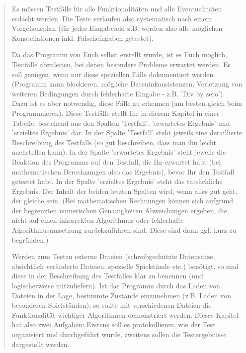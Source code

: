 \documentclass[12pt, letterpaper, twoside]{article}
\begin{document}
            \begin{verse}
                Es müssen Testfälle für alle Funktionalitäten und alle Eventualitäten erdacht werden. Die Tests verlaufen also systematisch nach einem Vorgehensplan (für jedes Eingabefeld z.B. werden also alle möglichen Konstellationen inkl. Falscheingaben getestet).

                Da das Programm von Euch selbst erstellt wurde, ist es Euch möglich, Testfälle abzuleiten, bei denen besondere Probleme erwartet werden. Es soll genügen, wenn nur diese speziellen Fälle dokumentiert werden (Programm kann blockieren, mögliche Dateninkonsistenzen, Verletzung von weiteren Bedingungen durch fehlerhafte Eingabe - z.B. 'Div by zero'). Dazu ist es aber notwendig, diese Fälle zu erkennen (am besten gleich beim Programmieren). 
                Diese Testfälle stellt Ihr in diesem Kapitel in einer Tabelle, bestehend aus den Spalten 'Testfall', 'erwartetes Ergebnis' und 'erzieltes Ergebnis' dar. In der Spalte 'Testfall' steht jeweils eine detaillierte Beschreibung des Testfalls (so gut beschreiben, dass man ihn leicht nachstellen kann). In der Spalte 'erwartetes Ergebnis' steht jeweils die Reaktion des Programms auf den Testfall, die Ihr erwartet habt (bei mathematischen Berechnungen also das Ergebnis), bevor Ihr den Testfall getestet habt. In der Spalte 'erzieltes Ergebnis' steht das tatsächliche Ergebnis. Der Inhalt der beiden letzten Spalten wird, wenn alles gut geht, der gleiche sein. (Bei mathematischen Rechnungen können sich aufgrund der begrenzten numerischen Genauigkeiten Abweichungen ergeben, die nicht auf einen inkorrekten Algorithmus oder fehlerhafte Algorithmusumsetzung zurückzuführen sind. Diese sind dann ggf. kurz zu begründen.) 
                
                Werden zum Testen externe Dateien (schreibgschützte Datensätze, absichtlich veränderte Dateien, spezielle Spielstände etc.) benötigt, so sind diese in der Beschreibung des Testfalles klar zu benennen (und logischerweise mitzuliefern). Ist das Programm durch das Laden von Dateien in der Lage, bestimmte Zustände einzunehmen (z.B. Laden von besonderen Spielständen), so sollte mit verschiedenen Dateien die Funktionalität wichtiger Algorithmen demonstriert werden.
                Dieses Kapitel hat also zwei Aufgaben: Erstens soll es protokollieren, wie der Test organisiert und durchgeführt wurde, zweitens sollen die Testergebnisse dargestellt werden.
            \end{verse}
        
\end{document}
